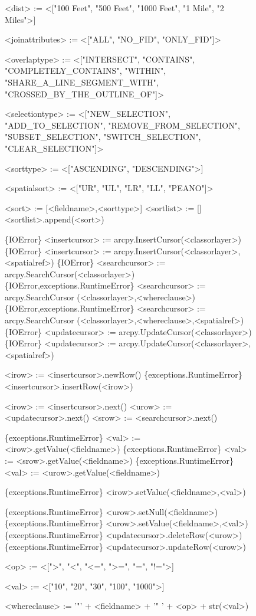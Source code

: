 \begin{figure}
{\begin{code}
<dist> := <["100 Feet", "500 Feet", "1000 Feet", "1 Mile", "2 Miles">]

<joinattributes> := <["ALL", "NO\_FID", "ONLY\_FID"]>

<overlaptype> := <["INTERSECT", "CONTAINS", "COMPLETELY\_CONTAINS", "WITHIN",
   "SHARE\_A\_LINE\_SEGMENT\_WITH", "CROSSED\_BY\_THE\_OUTLINE\_OF"]>

<selectiontype> := <["NEW\_SELECTION", "ADD\_TO\_SELECTION", "REMOVE\_FROM\_SELECTION",
   "SUBSET\_SELECTION", "SWITCH\_SELECTION", "CLEAR\_SELECTION"]>

<sorttype> := <["ASCENDING", "DESCENDING">]

<spatialsort> := <["UR", "UL", "LR", "LL", "PEANO"]>

<sort> := [<fieldname>,<sorttype>]
<sortlist> := []
<sortlist>.append(<sort>)

\{IOError\} <insertcursor> := arcpy.InsertCursor(<classorlayer>)
\{IOError\} <insertcursor> := arcpy.InsertCursor(<classorlayer>,<spatialref>)
\{IOError\} <searchcursor> := arcpy.SearchCursor(<classorlayer>)
\{IOError,exceptions.RuntimeError\} <searchcursor> := arcpy.SearchCursor
   (<classorlayer>,<whereclause>)
\{IOError,exceptions.RuntimeError\} <searchcursor> := arcpy.SearchCursor
   (<classorlayer>,<whereclause>,<spatialref>)
\{IOError\} <updatecursor> := arcpy.UpdateCursor(<classorlayer>)
\{IOError\} <updatecursor> := arcpy.UpdateCursor(<classorlayer>,<spatialref>)

<irow> := <insertcursor>.newRow()
\{exceptions.RuntimeError\} <insertcursor>.insertRow(<irow>)

<irow> := <insertcursor>.next()
<urow> := <updatecursor>.next()
<srow> := <searchcursor>.next()

\{exceptions.RuntimeError\} <val> := <irow>.getValue(<fieldname>)
\{exceptions.RuntimeError\} <val> := <srow>.getValue(<fieldname>)
\{exceptions.RuntimeError\} <val> := <urow>.getValue(<fieldname>)

\{exceptions.RuntimeError\} <irow>.setValue(<fieldname>,<val>)

\{exceptions.RuntimeError\} <urow>.setNull(<fieldname>)
\{exceptions.RuntimeError\} <urow>.setValue(<fieldname>,<val>)
\{exceptions.RuntimeError\} <updatecursor>.deleteRow(<urow>)
\{exceptions.RuntimeError\} <updatecursor>.updateRow(<urow>)

<op> := <[">", "<", "<=", ">=", "=", "!=">]  

<val> := <["10", "20", "30", "100", "1000">]

<whereclause> := '"' + <fieldname> + '" ' + <op> + str(<val>)


\end{code}}
\end{figure}
